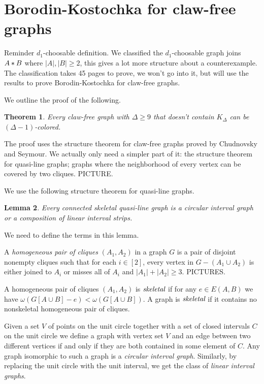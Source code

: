 \documentclass[12pt]{article}
\theoremstyle{plain}
\newtheorem{thm}{Theorem}[section]
\newtheorem{lem}[thm]{Lemma}
\theoremstyle{definition}
\theoremstyle{remark}
\newcommand{\card}[1]{\left|#1\right|}
\newcommand{\irange}[1]{\left[#1\right]}
\newcommand{\join}[2]{#1 \mbox{\hspace{2 pt}$\ast$\hspace{2 pt}} #2}
\begin{document}
\section{Borodin-Kostochka for claw-free graphs}
Reminder $d_1$-choosable definition. We classified the $d_1$-choosable graph joins $\join{A}{B}$ where $\card{A}, \card{B} \geq 2$, this gives a lot more structure about a counterexample.  The classification takes 45 pages to prove, we won't go into it, but will use the results to prove Borodin-Kostochka for claw-free graphs.

\bigskip
We outline the proof of the following.
\begin{thm}
Every claw-free graph with $\Delta \geq 9$ that doesn't contain $K_{\Delta}$ can be $(\Delta-1)$-colored.
\end{thm}

The proof uses the structure theorem for claw-free graphs proved by Chudnovsky and Seymour. We actually only need a simpler part of it: the structure theorem for quasi-line graphs; graphs where the neighborhood of every vertex can be covered by two cliques.  PICTURE.

\bigskip

We use the following structure theorem for quasi-line graphs.

\begin{lem}\label{QuasilineStructure}
Every connected skeletal quasi-line graph is a circular interval graph or a composition of
linear interval strips.
\end{lem}

We need to define the terms in this lemma.

A \emph{homogeneous pair of cliques} $(A_1, A_2)$ in a graph $G$ is a pair of
disjoint nonempty cliques such that for each $i \in \irange{2}$, every vertex in
$G - (A_1 \cup A_2)$ is either joined to $A_i$ or misses all of $A_i$ and
$\card{A_1} + \card{A_2} \geq 3$. PICTURES.

A homogeneous pair of cliques $(A_1, A_2)$ is $\emph{skeletal}$
if for any $e \in E(A, B)$ we have $\omega(G[A \cup B] - e) < \omega(G[A \cup
B])$.  A graph is $\emph{skeletal}$ if it contains no nonskeletal homogeneous
pair of cliques.  

\bigskip

Given a set $V$ of points on the unit circle together with a set of closed intervals $C$ on the unit circle we define a graph with vertex set $V$ and an edge between two different vertices if and only if they are both contained in some element of $C$.  Any graph isomorphic to such a graph is a \emph{circular interval graph}.  Similarly, by replacing the unit circle with the unit interval, we get the class of \emph{linear interval graphs}.
\end{document}
